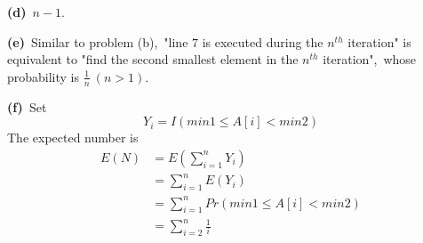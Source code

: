 \documentclass[]{article}
\begin{document}
	\textbf{(d)}\ $n-1$.
	
	\textbf{(e)}\ Similar to problem (b),\ "line $7$ is executed during the $n^{th}$ iteration" is equivalent to "find the second smallest element in the $n^{th}$ iteration",\ whose probability is $\frac{1}{n}\ (n>1)$.
	
	\textbf{(f)}\ Set
	\begin{equation*}
	Y_i = I(min1 \leq A[i] < min2)
	\end{equation*} 
	The expected number is
	\begin{equation*}
	\begin{aligned}
	E(N) &= E(\sum_{i=1}^{n} Y_i)\\
	& = \sum_{i=1}^{n}E(Y_i) \\
	& = \sum_{i=1}^{n} Pr(min1 \leq A[i] < min2)\\
	& = \sum_{i=2}^{n}\frac{1}{i}
	\end{aligned}
	\end{equation*}
\end{document}
